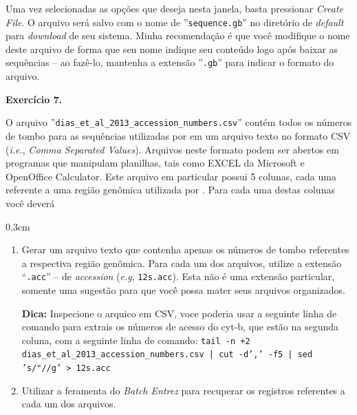 \begin{refsection}

Uma vez selecionadas as opções que deseja nesta janela, basta pressionar \textit{Create File}. O arquivo será salvo com o nome de ''\texttt{sequence.gb}'' no diretório de \textit{default} para \textit{download} de seu sistema. Minha recomendação é que você modifique o nome deste arquivo de forma que seu nome indique seu conteúdo logo após baixar as sequências -- ao fazê-lo, mantenha a extensão ''\texttt{.gb}'' para indicar o formato do arquivo.\\


\begin{blackBlock}{\textbf{Exercício 7.}}\label{tut7:ex:ex1}

O arquivo ''\texttt{dias\_et\_al\_2013\_accession\_numbers.csv}'' contém todos os números de tombo para as sequências utilizadas por \textcite{dias_et_al_2013} em um arquivo texto no formato CSV (\textit{i.e.}, \textit{Comma Separated Values}). Arquivos neste formato podem ser abertos em programas que manipulam planilhas, tais como EXCEL da Microsoft e OpenOffice Calculator. Este arquivo em particular possui 5 colunas, cada uma referente a uma região genômica utilizada por \textcite{dias_et_al_2013}. Para cada uma destas colunas você deverá

\end{blackBlock}


\begin {myindentpar}{0.3cm}
\begin{enumerate}[\itshape i.]
	\item{Gerar um arquivo texto que contenha apenas os números de tombo referentes a respectiva região genômica. Para cada um dos arquivos, utilize a extensão ``\texttt{.acc}'' -- de \textit{accession} (\textit{e.g}, \texttt{12s.acc}). Esta não é uma extensão particular, somente uma sugestão para que você possa mater seus arquivos organizados.}
 
    \tiny{\textbf{Dica:} Inspecione o arquico em CSV, voce poderia usar a seguinte linha de comando para extrais os números de acesso do cyt-b, que estão na segunda coluna, com a seguinte linha de comando: \texttt{tail -n +2 dias\_et\_al\_2013\_accession\_numbers.csv | cut -d',' -f5 | sed 's/"//g' > 12s.acc}}
    \normalsize
	\item{Utilizar a feramenta do \textit{Batch Entrez} para recuperar os registros referentes a cada um dos arquivos.}


\end{enumerate}
\end{myindentpar}
\end{refsection}

